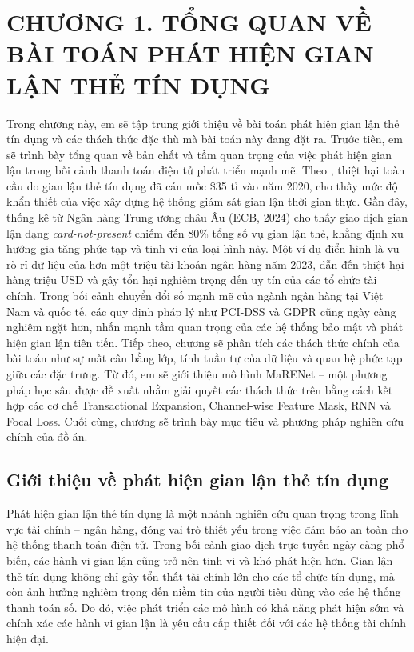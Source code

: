 \cleardoublepage
\section*{CHƯƠNG 1. TỔNG QUAN VỀ BÀI TOÁN PHÁT HIỆN GIAN LẬN THẺ TÍN DỤNG}

\setcounter{section}{1}
\setcounter{subsection}{0}
\setcounter{figure}{0}
\setcounter{table}{0}


Trong chương này, em sẽ tập trung giới thiệu về bài toán phát hiện gian lận thẻ tín dụng và các thách thức đặc thù mà bài toán này đang đặt ra. Trước tiên, em sẽ trình bày tổng quan về bản chất và tầm quan trọng của việc phát hiện gian lận trong bối cảnh thanh toán điện tử phát triển mạnh mẽ. Theo \cite{nilson2020fraud}, thiệt hại toàn cầu do gian lận thẻ tín dụng đã cán mốc \$35 tỉ vào năm 2020, cho thấy mức độ khẩn thiết của việc xây dựng hệ thống giám sát gian lận thời gian thực. Gần đây, thống kê từ Ngân hàng Trung ương châu Âu (ECB, 2024) cho thấy giao dịch gian lận dạng \textit{card-not-present} chiếm đến 80\% tổng số vụ gian lận thẻ, khẳng định xu hướng gia tăng phức tạp và tinh vi của loại hình này. Một ví dụ điển hình là vụ rò rỉ dữ liệu của hơn một triệu tài khoản ngân hàng năm 2023, dẫn đến thiệt hại hàng triệu USD và gây tổn hại nghiêm trọng đến uy tín của các tổ chức tài chính. Trong bối cảnh chuyển đổi số mạnh mẽ của ngành ngân hàng tại Việt Nam và quốc tế, các quy định pháp lý như PCI-DSS và GDPR cũng ngày càng nghiêm ngặt hơn, nhấn mạnh tầm quan trọng của các hệ thống bảo mật và phát hiện gian lận tiên tiến. Tiếp theo, chương sẽ phân tích các thách thức chính của bài toán như sự mất cân bằng lớp, tính tuần tự của dữ liệu và quan hệ phức tạp giữa các đặc trưng. Từ đó, em sẽ giới thiệu mô hình MaRENet – một phương pháp học sâu được đề xuất nhằm giải quyết các thách thức trên bằng cách kết hợp các cơ chế Transactional Expansion, Channel-wise Feature Mask, RNN và Focal Loss. Cuối cùng, chương sẽ trình bày mục tiêu và phương pháp nghiên cứu chính của đồ án.

\subsection{Giới thiệu về phát hiện gian lận thẻ tín dụng}

Phát hiện gian lận thẻ tín dụng là một nhánh nghiên cứu quan trọng trong lĩnh vực tài chính – ngân hàng, đóng vai trò thiết yếu trong việc đảm bảo an toàn cho hệ thống thanh toán điện tử. Trong bối cảnh giao dịch trực tuyến ngày càng phổ biến, các hành vi gian lận cũng trở nên tinh vi và khó phát hiện hơn. Gian lận thẻ tín dụng không chỉ gây tổn thất tài chính lớn cho các tổ chức tín dụng, mà còn ảnh hưởng nghiêm trọng đến niềm tin của người tiêu dùng vào các hệ thống thanh toán số. Do đó, việc phát triển các mô hình có khả năng phát hiện sớm và chính xác các hành vi gian lận là yêu cầu cấp thiết đối với các hệ thống tài chính hiện đại.

